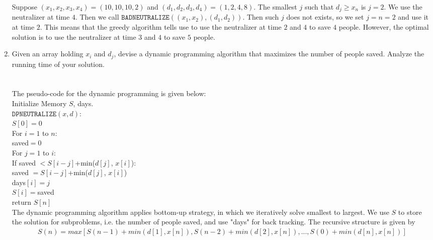 \documentclass[10pt]{article}
\begin{document}
\begin{enumerate}
    Suppose $(x_1, x_2, x_3, x_4) = (10, 10, 10, 2)$ and $(d_1, d_2, d_3, d_4) = (1,2,4,8)$. The smallest $j$ such that $d_j \geq  x_n$ is $j=2$. We use the neutralizer at time $4$. Then we call $\mathtt{BADNEUTRALIZE}((x_1, x_{2}), (d_1, d_{2}))$. Then such $j$ does not exists, so we set $j=n=2$ and use it at time $2$. This means that the greedy algorithm tells use to use the neutralizer at time $2$ and $4$ to save $4$ people. However, the optimal solution is to use the neutralizer at time $3$ and $4$ to save $5$ people.
    \item Given an array holding $x_i$ and $d_j$, devise a dynamic programming algorithm that maximizes the number of people saved. Analyze the running time of your solution.
    \\
    \\
    \\
    The pseudo-code for the dynamic programming is given below:\\
    Initialize Memory $S$, days.\\
    $\mathtt{DPNEUTRALIZE}(x, d)$:\\
    \-\hspace{0.5cm} $S[0]=0$\\
    \-\hspace{0.5cm} For $i=1$ to $n$:\\
    \-\hspace{1cm} saved$=0$\\
    \-\hspace{1cm} For $j=1$ to $i$:\\
    \-\hspace{1.5cm} If saved $< S[i-j]$+min($d[j]$, $x[i]$):\\
    \-\hspace{2cm} saved $= S[i-j]$+min($d[j]$, $x[i]$)\\
    \-\hspace{2cm} days$[i]=j$\\
    \-\hspace{1cm} $S[i]=$saved\\
    \-\hspace{0.5cm} return $S[n]$\\
    The dynamic programming algorithm applies bottom-up strategy, in which we iteratively solve smallest to largest. We use $S$ to store the solution for subproblems, i.e. the number of people saved, and use "days" for back tracking. The recursive structure is given by
    \begin{align}
        S(n) = max[S(n-1)+min(d[1],x[n]), S(n-2)+min(d[2],x[n]), ..., S(0)+min(d[n],x[n])]

\end{align}
\end{enumerate}
\end{document}
